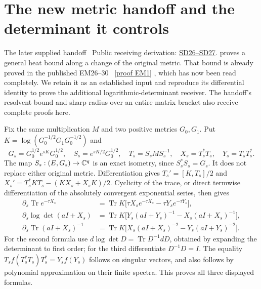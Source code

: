 \documentclass[11pt]{article}
\newcommand{\Tr}{\operatorname{Tr}}\newcommand{\rank}{\operatorname{rank}}
\begin{document}
\section{The new metric handoff and the determinant it controls}
The later supplied handoff \cite[Section 1]{metricintake}%
~Public receiving derivation: \href{https://github.com/KokunoYumeto/zeta-function-research-reader/blob/689a8f87e9c12b7a99b01b3123438c6751ee608f/workbenches/splitzero-tandem/continuations/20260920-original-spectral-determinant/ORIGINAL_SPECTRAL_DETERMINANT.tex\#L471}{SD26--SD27}.%
{} proves a
general heat bound along a change of the original metric. That bound is
already proved in the published EM26--30 \cite{EM}%
~\href{https://github.com/KokunoYumeto/zeta-function-research-reader/blob/5992ad50c0f2a06921f1fcaded7b4e38097c0739/workbenches/splitzero-tandem/continuations/20260920-original-kernel-mixed-determinants/providers/ENDPOINT_METRIC_HEAT.tex\#L38}{[proof EM1]}%
{}, which has now been
read completely. We retain it as an established input and reproduce its
differential identity to prove the additional logarithmic-determinant
receiver. The handoff's resolvent bound and sharp radius over an entire
matrix bracket also receive complete proofs here.

Fix the same multiplication $M$ and two positive metrics $G_0,G_1$.
Put $K=\log(G_0^{-1/2}G_1G_0^{-1/2})$ and
\[
G_s=G_0^{1/2}e^{sK}G_0^{1/2},\quad
S_s=e^{sK/2}G_0^{1/2},\quad T_s=S_sMS_s^{-1},\quad
X_s=T_s^*T_s,\quad Y_s=T_sT_s^*.
\]
The map $S_s:(E,G_s)\to\mathbb C^q$ is an exact isometry, since
$S_s^*S_s=G_s$. It does not replace either original metric.
Differentiation gives $T_s'=[K,T_s]/2$ and
$X_s'=T_s^*KT_s-(KX_s+X_sK)/2$. Cyclicity of the trace, or direct
termwise differentiation of the absolutely convergent exponential
series, then gives
\begin{equation}\tag{SD26}
\begin{aligned}
\partial_s\Tr e^{-\tau X_s}
&=\Tr K\bigl[\tau X_se^{-\tau X_s}-\tau Y_se^{-\tau Y_s}\bigr],\\
\partial_s\log\det(aI+X_s)
&=\Tr K\bigl[Y_s(aI+Y_s)^{-1}-X_s(aI+X_s)^{-1}\bigr],\\
\partial_s\Tr(aI+X_s)^{-1}
&=\Tr K\bigl[X_s(aI+X_s)^{-2}-Y_s(aI+Y_s)^{-2}\bigr].
\end{aligned}
\end{equation}
For the second formula use $d\log\det D=\Tr D^{-1}dD$, obtained by
expanding the determinant to first order; for the third differentiate
$D^{-1}D=I$. The equality
$T_s f(T_s^*T_s)T_s^*=Y_sf(Y_s)$ follows on singular vectors, and
also follows by polynomial approximation on their finite spectra.
This proves all three displayed formulas.
\end{document}
